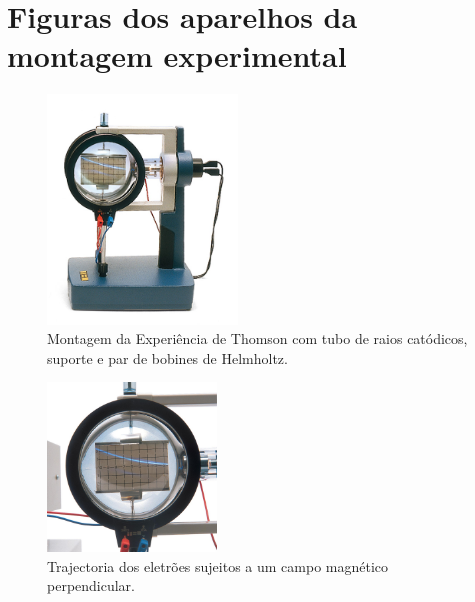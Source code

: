 \documentclass[a4paper,twoside,12pt]{article}      %
\begin{document}
\section{Figuras dos aparelhos da montagem experimental}
\begin{figure}
	[htb]  \centering 
	\includegraphics[width=0.45\textwidth]{./ThomsomEquip}
	\caption{Montagem da Experiência de Thomson com tubo de raios catódicos, suporte e par de bobines de Helmholtz. \label{fig:Thomson_Equip}} 
\end{figure}

\begin{figure}
	[hb]  \centering 
	\includegraphics[width=0.4\textwidth]{./Thomson_Electron-Deflection-Tube-D}
	\caption{Trajectoria dos eletrões sujeitos a um campo magnético perpendicular. \label{fig:Thomson_trajec}} 
\end{figure}

\newpage
\end{document}

